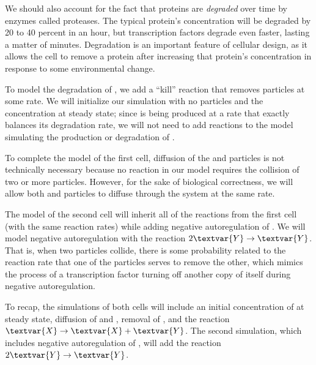 We should also account for the fact that proteins are \textit{degraded} over time by enzymes called proteases. The typical protein's concentration will be degraded by 20 to 40 percent in an hour, but transcription factors degrade even faster, lasting a matter of minutes. Degradation is an important feature  of cellular design, as it allows the cell to remove a protein after increasing that protein's concentration in response to some environmental change.

To model the degradation of , we add a ``kill'' reaction that removes  particles at some rate. We will initialize our simulation with no  particles and the  concentration at steady state; since  is being produced at a rate that exactly balances its degradation rate, we will not need to add reactions to the model simulating the production or degradation of .

To complete the model of the first cell, diffusion of the  and  particles is not technically necessary because no reaction in our model requires the collision of two or more particles. However, for the sake of biological correctness, we will allow both  and  particles to diffuse through the system at the same rate.\\

\begin{qbox}\end{qbox}

The model of the second cell will inherit all of the reactions from the first cell (with the same reaction rates) while adding negative autoregulation of . We will model negative autoregulation with the reaction $2\textvar{Y} \rightarrow \textvar{Y}$. That is, when two  particles collide, there is some probability related to the reaction rate that one of the particles serves to remove the other, which mimics the process of a transcription factor turning off another copy of itself during negative autoregulation.

To recap, the simulations of both cells will include an initial concentration of  at steady state, diffusion of  and , removal of , and the reaction $\textvar{X} \rightarrow \textvar{X} + \textvar{Y}$. The second simulation, which includes negative autoregulation of , will add the reaction $2\textvar{Y} \rightarrow \textvar{Y}$. \\

